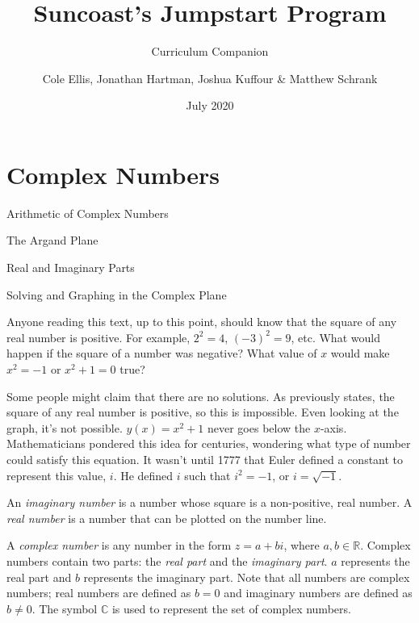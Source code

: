 \documentclass[lang=en,11pt]{elegantbook}
\title{Suncoast's Jumpstart Program}
\subtitle{Curriculum Companion}
\author{Cole Ellis, Jonathan Hartman, Joshua Kuffour \& Matthew Schrank}
\institute{Suncoast High School}
\date{July 2020}
\begin{document}
\maketitle

\frontmatter
\tableofcontents

\mainmatter



\chapter{Complex Numbers}
\begin{introduction}[Contents]
\item Arithmetic of Complex Numbers
\item The Argand Plane
\item Real and Imaginary Parts
\item Solving and Graphing in the Complex Plane
\end{introduction}
\noindent Anyone reading this text, up to this point, should know that the square of any real number is positive.  For example, $2^2=4$, $(-3)^2=9$, etc.  What would happen if the square of a number was negative?  What value of $x$ would make $x^2=-1$ or $x^2+1=0$ true?

Some people might claim that there are no solutions.  As previously states, the square of any real number is positive, so this is impossible.  Even looking at the graph, it's not possible.  $y(x)=x^2+1$ never goes below the $x$-axis.  Mathematicians pondered this idea for centuries, wondering what type of number could satisfy this equation.  It wasn't until 1777 that Euler defined a constant to represent this value, $i$.  He defined $i$ such that $i^2=-1$, or $i=\sqrt{-1}$.

An \textit{imaginary number} is a number whose square is a non-positive, real number.  A \textit{real number} is a number that can be plotted on the number line.

A \textit{complex number} is any number in the form $z=a+bi$, where $a,b\in\mathbb{R}$.  Complex numbers contain two parts: the \textit{real part} and the \textit{imaginary part}.  $a$ represents the real part and $b$ represents the imaginary part.  Note that all numbers are complex numbers; real numbers are defined as $b=0$ and imaginary numbers are defined as $b\neq 0$.  The symbol $\mathbb{C}$ is used to represent the set of complex numbers.
\end{document}
